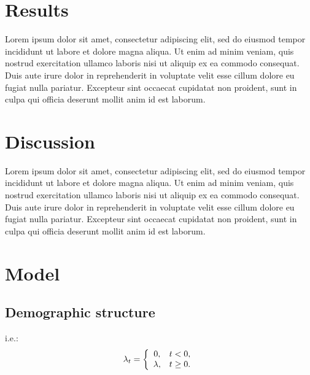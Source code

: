 \documentclass[nogrid]{MBE}%
\begin{document}
\section{{Results}\label{sec:Results}}

Lorem ipsum dolor sit amet, consectetur adipiscing elit, sed do eiusmod tempor incididunt ut labore et dolore magna aliqua. Ut enim ad minim veniam, quis nostrud exercitation ullamco laboris nisi ut aliquip ex ea commodo consequat. Duis aute irure dolor in reprehenderit in voluptate velit esse cillum dolore eu fugiat nulla pariatur. Excepteur sint occaecat cupidatat non proident, sunt in culpa qui officia deserunt mollit anim id est laborum.

\section{{Discussion}\label{sec:Discussion}}

Lorem ipsum dolor sit amet, consectetur adipiscing elit, sed do eiusmod tempor incididunt ut labore et dolore magna aliqua. Ut enim ad minim veniam, quis nostrud exercitation ullamco laboris nisi ut aliquip ex ea commodo consequat. Duis aute irure dolor in reprehenderit in voluptate velit esse cillum dolore eu fugiat nulla pariatur. Excepteur sint occaecat cupidatat non proident, sunt in culpa qui officia deserunt mollit anim id est laborum.


\section{Model\label{sec:Model}}

\subsection{Demographic structure}



i.e.:
\begin{equation}
\lambda_{t}=\left\{
\begin{array}
[c]{cc}%
0, & t<0,\\
\lambda, & t\geq0.
\end{array}
\right.  \label{eq:lambda}%
\end{equation}
\end{document}
